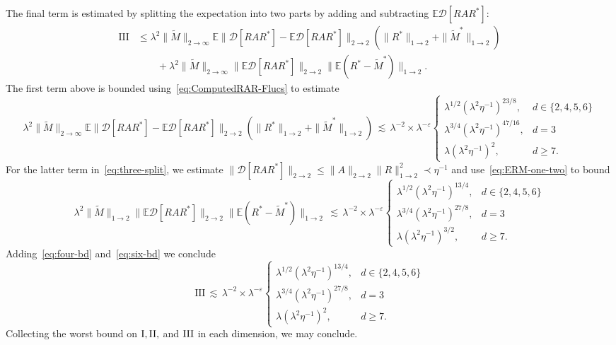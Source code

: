 \documentclass[11pt]{amsart}
\def\Expec{{\mathbb E}}
\def\eps{{\varepsilon}}
\def\lsim{{\,\lesssim\,}}
\newcommand{\mcal}[1]{{\mathcal{#1}}}
\newcommand{\ldom}{\prec}
\numberwithin{equation}{section}
\numberwithin{theorem}{section}
\begin{document}
The final term is estimated by splitting the expectation into two parts by adding and subtracting
$\Expec \mcal{D}[RAR^*]$:
\begin{equation}
\label{eq:three-split}
\begin{split}
\textrm{III}
&\leq \lambda^2 \|\tilde{M}\|_{2\to \infty}
\Expec
\|\mcal{D}[RAR^*] - \Expec \mcal{D}[RAR^*]\|_{2\to 2}
(\|R^*\|_{1\to 2}+\|\tilde{M}^*\|_{1\to 2}) \\
&\qquad + \lambda^2 \|\tilde{M}\|_{2\to\infty}
\|\Expec \mcal{D}[RAR^*]\|_{2\to 2}
\|\Expec (R^*-\tilde{M}^*)\|_{1\to2}.
\end{split}
\end{equation}
The first term above is bounded using~\eqref{eq:ComputedRAR-Flucs}
to estimate
\begin{equation}
\label{eq:four-bd}
\lambda^2 \|\tilde{M}\|_{2\to \infty}
\Expec \|\mcal{D}[RAR^*] - \Expec \mcal{D}[RAR^*]\|_{2\to 2}
(\|R^*\|_{1\to2}+\|\tilde{M}^*\|_{1\to 2})
\lsim
\lambda^{-2} \times \lambda^{-\eps}
\begin{cases}
\lambda^{1/2}(\lambda^2\eta^{-1})^{23/8}, &d\in\{2,4,5,6\} \\
\lambda^{3/4}(\lambda^2\eta^{-1})^{47/16}, &d=3 \\
\lambda (\lambda^2\eta^{-1})^2, &d\geq 7.
\end{cases}
\end{equation}
For the latter term in~\eqref{eq:three-split}, we estimate $\|\mcal{D}[RAR^*]\|_{2\to 2}
\leq \|A\|_{2\to 2} \|R\|_{1\to 2}^2 \ldom \eta^{-1}$ and use~\eqref{eq:ERM-one-two} to bound
\begin{equation}
\label{eq:six-bd}
\lambda^2 \|\tilde{M}\|_{1\to 2} \|\Expec\mcal{D}[RAR^*]\|_{2\to2} \|\Expec (R^*-\tilde{M}^*)\|_{1\to 2}
\lsim \lambda^{-2} \times \lambda^{-\eps}
\begin{cases}
\lambda^{1/2} (\lambda^2\eta^{-1})^{13/4} , &d\in\{2,4,5,6\} \\
\lambda^{3/4} (\lambda^2\eta^{-1})^{27/8} , &d=3 \\
\lambda (\lambda^2\eta^{-1})^{3/2} , &d\geq 7.
\end{cases}
\end{equation}
Adding~\eqref{eq:four-bd} and~\eqref{eq:six-bd} we conclude
\[
\textrm{III}
\lsim \lambda^{-2} \times \lambda^{-\eps}
\begin{cases}
\lambda^{1/2} (\lambda^2\eta^{-1})^{13/4} , &d\in\{2,4,5,6\} \\
\lambda^{3/4} (\lambda^2\eta^{-1})^{27/8} , &d=3 \\
\lambda (\lambda^2\eta^{-1})^{2} , &d\geq 7.
\end{cases}
\]
Collecting the worst bound on ${\rm I},\rm{II},$ and $\rm{III}$ in each dimension, we may conclude.
\end{document}
